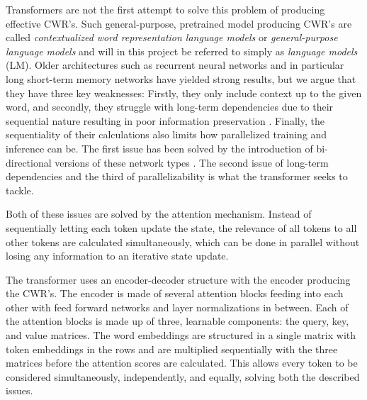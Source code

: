 \documentclass[main.tex]{subfiles}
\begin{document}
Transformers are not the first attempt to solve this problem of producing effective CWR's.
Such general-purpose, pretrained model producing CWR's are called  \emph{contextualized word representation language models} or \emph{general-purpose language models} \cite[Ch. 2]{birk2020knowledge} and will in this project be referred to simply as \emph{language models} (LM).
Older architectures such as recurrent neural networks \cite[Ch. 10]{Goodfellow-et-al-2016} and in particular long short-term memory networks \cite{hochreiter1997lstm} have yielded strong results, but we argue that they have three key weaknesses:
Firstly, they only include context up to the given word, and secondly, they struggle with long-term dependencies due to their sequential nature resulting in poor information preservation \cite{Goodfellow-et-al-2016}.
Finally, the sequentiality of their calculations also limits how parallelized training and inference can be.
The first issue has been solved by the introduction of bi-directional versions of these network types \cite{schuster1997birnn}.
The second issue of long-term dependencies and the third of parallelizability is what the transformer seeks to tackle.

Both of these issues are solved by the attention mechanism.
Instead of sequentially letting each token update the state, the relevance of all tokens to all other tokens are calculated simultaneously, which can be done in parallel without losing any information to an iterative state update.

The transformer uses an encoder-decoder structure with the encoder producing the CWR's.
The encoder is made of several attention blocks feeding into each other with feed forward networks and layer normalizations in between.
Each of the attention blocks is made up of three, learnable components: the query, key, and value matrices.
The word embeddings are structured in a single matrix with token embeddings in the rows and are multiplied sequentially with the three matrices before the attention scores are calculated.
This allows every token to be considered simultaneously, independently, and equally, solving both the described issues.
\cite{vaswani2017att}
\end{document}
